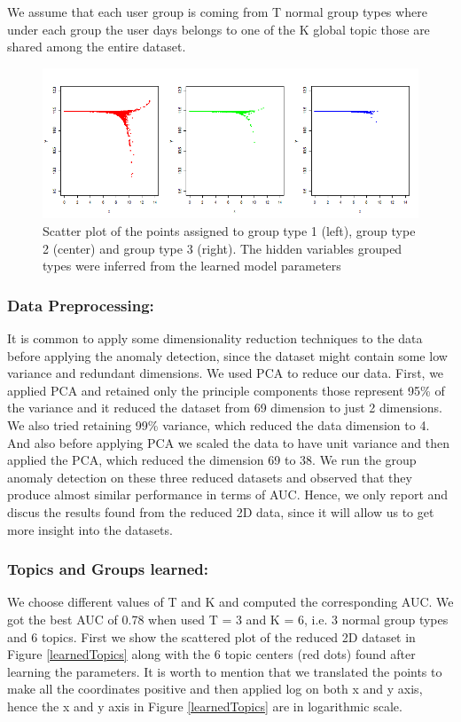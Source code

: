 \documentclass[letterpaper]{article}
\begin{document}
We assume that each user group is coming from T normal group types where under each group the user days belongs to one of the K global topic those are shared among the entire dataset.

\begin{figure}
\begin{center}
\includegraphics[bb = 0 5 785 285,clip=true,scale=0.65]{Groups.png}
\end{center}
\caption{Scatter plot of the points assigned to group type 1 (left), group type 2 (center) and group type 3 (right). The hidden variables grouped types were inferred from the learned model parameters}\label{learnedGroups}
\end{figure}

\subsubsection{Data Preprocessing:}
It is common to apply some dimensionality reduction techniques to the data before applying the anomaly detection, since the dataset might contain some low variance and redundant dimensions. We used PCA to reduce our data. First, we applied PCA and retained only the principle components those represent 95\% of the variance and it reduced the dataset from 69 dimension to just 2 dimensions. We also tried retaining 99\% variance, which reduced the data dimension to 4. And also before applying PCA we scaled the data to have unit variance and then applied the PCA, which reduced the dimension 69 to 38. We run the group anomaly detection on these three reduced datasets and observed that they produce almost similar performance in terms of AUC. Hence, we only report and discus the results found from the reduced 2D data, since it will allow us to get more insight into the datasets.


\subsubsection{Topics and Groups learned:} We choose different values of T and K and computed the corresponding AUC. We got the best AUC of 0.78 when used T = 3 and K = 6, i.e. 3 normal group types and 6 topics. First we show the scattered plot of the reduced 2D dataset in Figure \ref{learnedTopics} along with the 6 topic centers (red dots) found after learning the parameters. It is worth to mention that we translated the points to make all the coordinates positive and then applied log on both x and y axis, hence the x and y axis in Figure \ref{learnedTopics} are in logarithmic scale.
\end{document}
